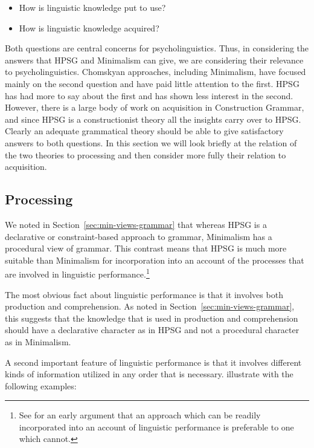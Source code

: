\documentclass[output=paper,biblatex,babelshorthands,newtxmath,draftmode,colorlinks,citecolor=brown]{langscibook}
\begin{document}
\begin{itemize}
\item How is linguistic knowledge put to use? 
\item How is linguistic knowledge acquired?
\end{itemize}

\noindent
Both questions are central concerns for psycholinguistics. Thus, in considering the answers that
HPSG and Minimalism can give, we are considering their relevance to psycholinguistics. Chomskyan
approaches, including Minimalism, have focused mainly on the second question and have paid little
attention to the first. HPSG has had more to say about the first and has shown less interest in the
second. However, there is a large body of work on acquisition in Construction Grammar\indexcxg, and
since HPSG is a constructionist theory  all the insights carry over to HPSG. 
Clearly an adequate grammatical theory should be able to give satisfactory answers to both
questions. In this section we will look briefly at the relation of the two theories to processing
and then consider more fully their relation to acquisition.


\subsection{Processing}
\label{sec-minimalism-processing}

We noted in Section~\ref{sec:min-views-grammar} that whereas HPSG is a declarative or
constraint-based approach to grammar, Minimalism has a procedural view of grammar. This contrast
means that HPSG is much more suitable than Minimalism for incorporation into an account of the
processes that are involved in linguistic performance.\footnote{
  See \citet{BK82a} for an early argument that an approach which can be readily incorporated into an account of linguistic performance is preferable to one which cannot.
}

The most obvious fact about linguistic performance is that it involves both production and
comprehension. As noted in Section~\ref{sec:min-views-grammar}, this suggests that the knowledge
that is used in production and comprehension should have a declarative character as in HPSG and not
a procedural character as in Minimalism.

A second important feature of linguistic performance is
that it involves different kinds of information utilized in any order that is
necessary. \citet[--368]{SW2011a} illustrate with the following examples:
\end{document}
